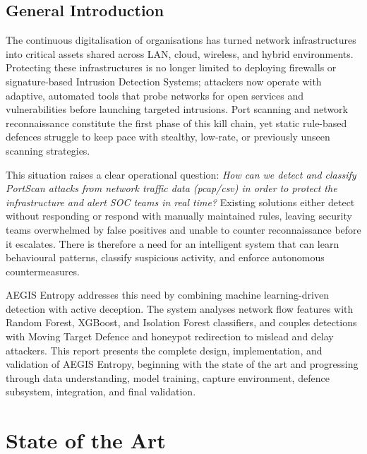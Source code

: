 \documentclass[12pt,a4paper]{report}
\begin{document}
\tableofcontents
\listoffigures
\listoftables
\newpage

\section*{General Introduction}

The continuous digitalisation of organisations has turned network infrastructures into critical assets shared across LAN, cloud, wireless, and hybrid environments. Protecting these infrastructures is no longer limited to deploying firewalls or signature-based Intrusion Detection Systems; attackers now operate with adaptive, automated tools that probe networks for open services and vulnerabilities before launching targeted intrusions. Port scanning and network reconnaissance constitute the first phase of this kill chain, yet static rule-based defences struggle to keep pace with stealthy, low-rate, or previously unseen scanning strategies.

This situation raises a clear operational question: \textit{How can we detect and classify PortScan attacks from network traffic data (pcap/csv) in order to protect the infrastructure and alert SOC teams in real time?} Existing solutions either detect without responding or respond with manually maintained rules, leaving security teams overwhelmed by false positives and unable to counter reconnaissance before it escalates. There is therefore a need for an intelligent system that can learn behavioural patterns, classify suspicious activity, and enforce autonomous countermeasures.

AEGIS Entropy addresses this need by combining machine learning-driven detection with active deception. The system analyses network flow features with Random Forest, XGBoost, and Isolation Forest classifiers, and couples detections with Moving Target Defence and honeypot redirection to mislead and delay attackers. This report presents the complete design, implementation, and validation of AEGIS Entropy, beginning with the state of the art and progressing through data understanding, model training, capture environment, defence subsystem, integration, and final validation.

\chapter{State of the Art}\label{ch:state_of_art}
\end{document}
